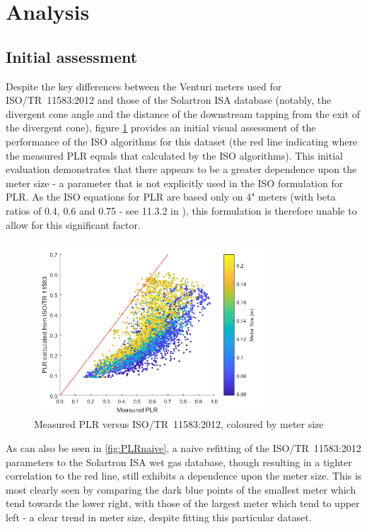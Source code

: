 \documentclass[journal]{IEEEtran}
\begin{document}
\section{Analysis}

\subsection{Initial assessment} \label{ssect:Initial}
Despite the key differences between the Venturi meters used for ISO/TR~11583:2012 and those of the Solartron ISA database (notably, the divergent cone angle and the distance of the downstream tapping from the exit of the divergent cone), figure \ref{fig:PLR2} provides an initial visual assessment of the performance of the ISO algorithms for this dataset (the red line indicating where the measured PLR equals that calculated by the ISO algorithms). This initial evaluation demonstrates that there appears to be a greater dependence upon the meter size - a parameter that is not explicitly used in the ISO formulation for \acrshort{PLR}. As the ISO equations for PLR are based only on 4" meters (with beta ratios of 0.4, 0.6 and 0.75 - see 11.3.2 in \cite{Reader-Harris2015}), this formulation is therefore unable to allow for this significant factor. 

\begin{figure}[h]
\centering
\includegraphics[width=3.4in]{PLR2.png}
\caption[]{ Measured PLR versus ISO/TR~11583:2012, coloured by meter size }
\label{fig:PLR2}
\end{figure}

As can also be seen in \ref{fig:PLRnaive}, a naive refitting of the ISO/TR~11583:2012 parameters to the Solartron ISA wet gas database, though resulting in a tighter correlation to the red line, still exhibits a dependence upon the meter size.  This is most clearly seen by comparing the dark blue points of the smallest meter which tend towards the lower right, with those of the largest meter which tend to upper left - a clear trend in meter size, despite fitting this particular dataset.
\end{document}
